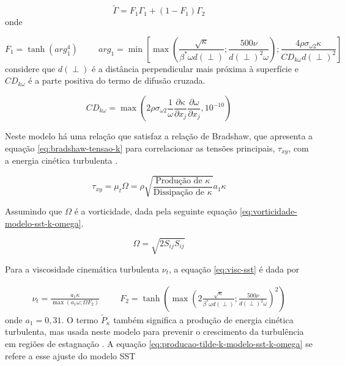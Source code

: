 \begin{equation}
	\label{eq:funcaomistura-modelo-sst-k-omega}
    \tilde{\Gamma} = F_1 \Gamma_1 + (1 - F_1) \Gamma_2
\end{equation}
%
onde 

\begin{equation}
		F_1 = \tanh{(arg_1^{4})}
		\hspace{1cm}
    	arg_1 = \min\left[\max\left(\frac{\sqrt{\kappa}}{\beta^{*}\omega d(\perp)};\frac{500\nu}{d(\perp)^2 \omega}\right);\frac{4\rho\sigma_{\omega 2}\kappa}{CD_{k\omega}d(\perp)^2}\right]
\end{equation}
%
considere que $d(\perp)$ é a distância perpendicular mais próxima à superfície e $CD_{k\omega}$ é a parte positiva do termo de difusão cruzada.

\begin{equation}
    CD_{k\omega} = \max\left(2\rho\sigma_{\omega 2}\frac{1}{\omega}\frac{\partial \kappa}{\partial x_j}\frac{\partial \omega}{\partial x_j}, 10^{-10} \right)
\end{equation}

Neste modelo há uma relação que satisfaz a relação de Bradshaw, que apresenta a equação \ref{eq:bradshaw-tensao-k} para correlacionar as tensões principais, $\tau_{xy}$, com a energia cinética turbulenta \cite{Menter1994TwoequationET}.

\begin{equation}
	\label{eq:bradshaw-tensao-k}
	\tau_{xy} = \mu_{t}\Omega = \rho\sqrt{\frac{\text{Produção de }\kappa}{\text{Dissipação de }\kappa}}a_{1}\kappa
\end{equation}

Assumindo que $\Omega$ é a vorticidade, dada pela seguinte equação \ref{eq:vorticidade-modelo-sst-k-omega}.

\begin{equation}
	\label{eq:vorticidade-modelo-sst-k-omega}
	\Omega = \sqrt{2 S_{ij}S_{ij}}
\end{equation}

Para a viscosidade cinemática turbulenta $\nu_t$, a equação \ref{eq:visc-sst} é dada por

\begin{equation}
\begin{split}
    \label{eq:visc-sst}
    \nu_t = \frac{a_1 \kappa}{\max(a_1 \omega;\Omega F_2)} \hspace{1cm}
    F_2 = \tanh{\left(\max\left(2\frac{\sqrt{\kappa}}{\beta^{*}\omega d(\perp)}; \frac{500\nu}{ d(\perp)^2\omega}\right)^{2}\right)} 
\end{split}
\end{equation}
%
onde $a_1 = 0,31$. O termo $\tilde{P}_{\kappa}$ também significa a produção de energia cinética turbulenta, mas usada neste modelo para prevenir o crescimento da turbulência em regiões de estagnação \cite{Menter2009}. A equação \ref{eq:producao-tilde-k-modelo-sst-k-omega} se refere a esse ajuste do modelo SST

